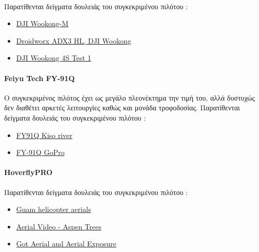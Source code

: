 \documentclass[a4paper, 12pt, twoside]{report}
\begin{document}
{{{{{{			\paragraph{}{Παρατίθενται δείγματα δουλειάς του συγκεκριμένου πιλότου :
				\begin{itemize}
					\item \href{https://vimeo.com/38972821}{DJI Wookong-M}
					\item \href{https://vimeo.com/43035644}{Droidworx ADX3 HL, DJI Wookong}
					\item \href{https://vimeo.com/40803086}{DJI Wookong 4S Test 1}			
				\end{itemize}
			}
			
			\paragraph{Feiyu Tech FY-91Q}{Ο συγκεκριμένος πιλότος έχει ως μεγάλο πλεονέκτημα την τιμή του, αλλά δυστυχώς δεν διαθέτει αρκετές λειτουργίες καθώς και μονάδα τροφοδοσίας. Παρατίθενται δείγματα δουλειάς του συγκεκριμένου πιλότου :
				\begin{itemize}
					\item \href{https://vimeo.com/27469866}{FY91Q Kiso river}
					\item \href{http://www.youtube.com/watch?v=5JWZVufFHKQ}{FY-91Q GoPro}
				\end{itemize}
			}
			
			\paragraph{HoverflyPRO}{Παρατίθενται δείγματα δουλειάς του συγκεκριμένου πιλότου :
				\begin{itemize}
					\item \href{https://vimeo.com/26895602#}{Guam helicopter aerials}
					\item \href{http://www.youtube.com/watch?v=b0fwnqsdI8w}{Aerial Video - Aspen Trees}
					\item \href{https://vimeo.com/29466533#}{Got Aerial and Aerial Exposure}
				\end{itemize}
			}
			
			\begin{landscape}	
			\setlength\LTleft{0pt}            %
			\setlength\LTright{0pt}           %
	

\end{landscape}}}}}}}
\end{document}
